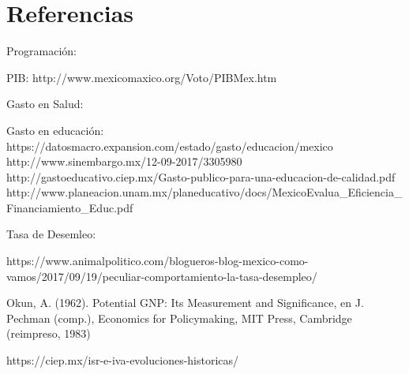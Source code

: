 
\section{Referencias}






Programación:\bigskip

PIB:\bigskip
http://www.mexicomaxico.org/Voto/PIBMex.htm\bigskip


Gasto en Salud:\bigskip


Gasto en educación:\bigskip
https://datosmacro.expansion.com/estado/gasto/educacion/mexico\bigskip
http://www.sinembargo.mx/12-09-2017/3305980\bigskip
http://gastoeducativo.ciep.mx/Gasto-publico-para-una-educacion-de-calidad.pdf\bigskip
http://www.planeacion.unam.mx/planeducativo/docs/MexicoEvalua\_Eficiencia\_Financiamiento\_Educ.pdf\bigskip

Tasa de Desemleo: \bigskip



https://www.animalpolitico.com/blogueros-blog-mexico-como-vamos/2017/09/19/peculiar-comportamiento-la-tasa-desempleo/ \bigskip



Okun, A. (1962). Potential GNP: Its Measurement and Significance, en J. Pechman (comp.), Economics for Policymaking, MIT Press, Cambridge (reimpreso, 1983) \bigskip



https://ciep.mx/isr-e-iva-evoluciones-historicas/\bigskip





